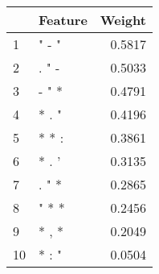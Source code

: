 \begin{tabular}{llr}
\toprule
{} & Feature &  Weight \\
\midrule
1  &   " - " &  0.5817 \\
2  &   . " - &  0.5033 \\
3  &   - " * &  0.4791 \\
4  &   * . " &  0.4196 \\
5  &   * * : &  0.3861 \\
6  &   * . ' &  0.3135 \\
7  &   . " * &  0.2865 \\
8  &   " * * &  0.2456 \\
9  &   * , * &  0.2049 \\
10 &   * : " &  0.0504 \\
\bottomrule
\end{tabular}
